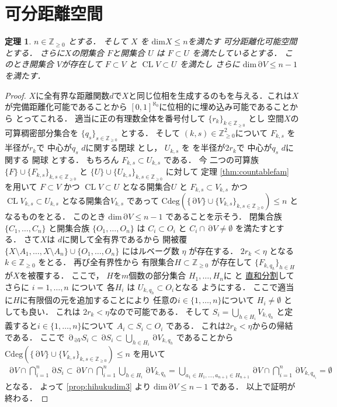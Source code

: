 \documentclass[leqno, a4paper, 12pt]{jsarticle}
\newtheorem{thm}{定理}
\newcommand{\zz}{\mathbb{Z}}
\DeclareMathOperator{\bd}{\partial}
\DeclareMathOperator{\cl}{CL}
\newcommand{\yodim}{\mathrm{dim}}
\newcommand{\yodeg}{\mathrm{Cdeg}}
\numberwithin{equation}{section}
\begin{document}
\section{可分距離空間}
\begin{thm}\label{thm:bundaryn-1}
$n\in \zz_{\ge 0}$
とする．
そして
$X$
を
$\yodim X \le n$を満たす
可分距離化可能空間とする．
さらに$X$の閉集合
$F$と開集合
$U$
は
$F\subset U$
を満たしているとする．
このとき開集合
$V$が存在して
$F\subset V$
と
$\cl V \subset U$
を満たし
さらに
$\yodim \bd V\le n-1$
を満たす．
\end{thm}
\begin{proof}
$X$に全有界な距離関数$d$で$X$と同じ位相を生成するのもを与える．これは$X$が完備距離化可能であることから
$[0, 1]^{\aleph_{0}}$に位相的に埋め込み可能であることから
とってこれる．
適当に正の有理数全体を番号付して
$\{r_{k}\}_{k\in \zz_{\ge 0}}$
とし
空間$X$の可算稠密部分集合を
$\{q_{s}\}_{s\in \zz_{\ge 0}}$
とする．
そして
$(k, s)\in \zz_{\ge 0}^{2}$について
$F_{k, s}$
を半径が$r_{k}$で
中心が$q_{s}$
$d$に関する閉球
とし，
$U_{k, s}$
を
を半径が$2r_{k}$で
中心が$q_{s}$
$d$に関する
開球
とする．
もちろん
$F_{k, s}\subset U_{k, s}$
である．
今
二つの可算族
$\{F\}\cup \{F_{k, s}\}_{k, s\in \zz_{\ge 0}}$
と
$\{U\}\cup \{U_{k, s}\}_{k, s\in \zz_{\ge 0}}$
に対して
定理
\ref{thm:countablefam}
を用いて
$F\subset V$
かつ
$\cl V\subset U$
となる開集合$U$
と
$F_{k, s}\subset V_{k, s}$
かつ
$\cl V_{k, s}\subset U_{k, s}$
となる開集合$V_{k, s}$
であって
$\yodeg(\{\bd V\}\cup \{V_{k, s}\}_{k, s\in \zz_{\ge 0}})\le n $
となるものをとる．
このとき
$\yodim \bd V\le n-1$
であることを示そう．
閉集合族
$\{C_{1}, \dots, C_{n}\}$
と開集合族
$\{O_{1}, \dots, O_{n}\}$
は
$C_{i}\subset O_{i}$
と
$C_{i}\cap \bd V\neq \emptyset$
を満たすとする．
さて$X$は
$d$に関して全有界であるから
開被覆$\{X\setminus A_{1}, \dots, X\setminus A_{n}\}\cup \{O_{1}, \dots, O_{n}\}$
にはルベーグ数
$\eta$
が存在する．
$2r_{k}<\eta$
となる$k\in \zz_{\ge 0}$
をとる．
再び全有界性から
有限集合$H\subset \zz_{\ge 0}$
が存在して
$\{F_{k, q_{h}}\}_{h\in H}$
が$X$を被覆する．
ここで，
$H$を$m$個数の部分集合
$H_{1}, \dots, H_{n}$に
と
\underline{直和分割}してさらに
$i=1, \dots, n$
について
各$H_{i}$
は
$U_{k, q_{h}}\subset O_{i}$となる
ようにする．
ここで適当に$H$に有限個の元を追加することにより
任意の$i\in \{1, \dots, n\}$について
$H_{i}\neq \emptyset$
としても良い．
これは
$2r_{k}<\eta$なので可能である．
そして
$S_{i}=\bigcup_{h\in H_{i}}V_{k, q_{h}}$
と定義すると$i\in \{1, \dots, n\}$について
$A_{i}\subset S_{i}\subset O_{i}$
である．
これは$2r_{k}<\eta$からの帰結である．
ここで
$\bd_{\bd V} S_{i}\subset \bd S_{i}\subset \bigcup_{h\in H_{i}}\bd V_{k, q_{h}}$
であることから
$\yodeg(\{\bd V\}\cup \{V_{k, s}\}_{k, s\in \zz_{\ge 0}})\le n $
を用いて
\begin{align}
\bd V\cap \bigcap_{i=1}^{n}\bd S_{i}
\subset 
\bd V\cap 
\bigcap_{i=1}^{n}\bigcup_{h\in H_{i}}\bd V_{k, q_{h}}
=\bigcup_{a_{1}\in H_{1}, \dots, a_{n+1}\in H_{n+1}}
\bd V\cap \bigcap_{i=1}^{n}\bd V_{k, q_{a_{i}}}=\emptyset
\end{align}
となる．
よって
\ref{prop:hihukudim3}
より
$\yodim \bd V\le n-1$
である．
以上で証明が終わる．
\end{proof}
\end{document}
